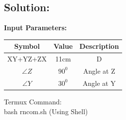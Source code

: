 \documentclass[10pt,a4paper]{report}
\begin{document}
\begin{multicols}{2}
\section{Solution: }
\raggedright \textbf{Input Parameters:}\\
\vspace{1mm}
\begin{center}
\begin{tabular}{|c|c|c|}
	\hline
	\textbf{Symbol}&\textbf{Value}&\textbf{Description}\\
	\hline
	XY+YZ+ZX & 11cm & D\\
	\hline 
	$\angle{Z}$ & $90^0$ & Angle at Z \\
	\hline
	$\angle{Y}$ & $30^0$ & Angle at Y \\
	\hline
	
\end{tabular}
\end{center}
\vspace{3mm}



\raggedright Termux Command:\\
               \centering bash rncom.sh (Using Shell)\\
               \vspace{3mm} 


\end{multicols}
\end{document}
